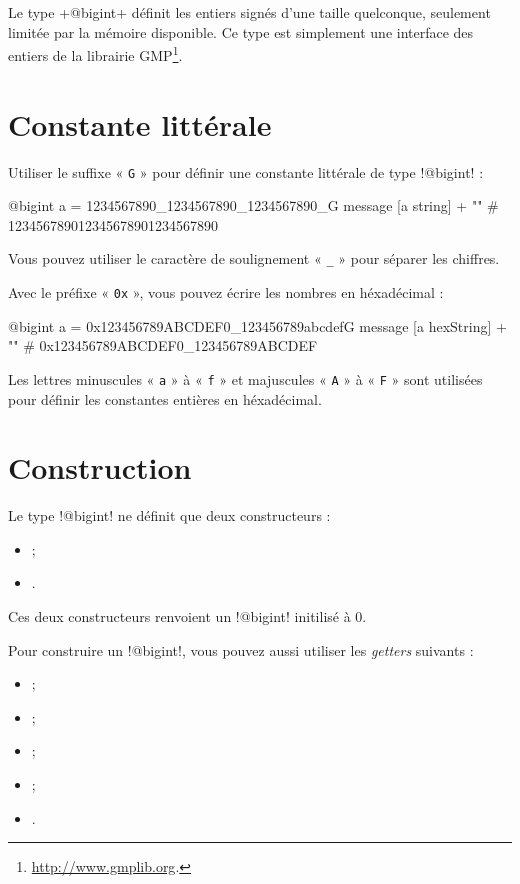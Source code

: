 



Le type \ggst+@bigint+ définit les entiers signés d'une taille quelconque, seulement limitée par la mémoire disponible. Ce type est simplement une interface des entiers de la librairie GMP\footnote{\url{http://www.gmplib.org}.}.

\section{Constante littérale}

Utiliser le suffixe « \texttt{G} » pour définir une constante littérale de type \ggst!@bigint! :
\begin{galgas3}
@bigint a = 1234567890_1234567890_1234567890_G
message [a string] + "\n" # 123456789012345678901234567890
\end{galgas3}

Vous pouvez utiliser le caractère de soulignement « \texttt{\_} » pour séparer les chiffres.

Avec le préfixe « \texttt{0x} », vous pouvez écrire les nombres en héxadécimal :
\begin{galgas3}
@bigint a = 0x123456789ABCDEF0_123456789abcdefG
message [a hexString] + "\n" # 0x123456789ABCDEF0_123456789ABCDEF
\end{galgas3}

Les lettres minuscules « \texttt{a} » à « \texttt{f} » et majuscules « \texttt{A} » à « \texttt{F} » sont utilisées pour définir les constantes entières en héxadécimal.

\section{Construction}

Le type \ggst!@bigint! ne définit que deux constructeurs :
\begin{itemize}
  \item {} ;
  \item {}.
\end{itemize}

Ces deux constructeurs renvoient un \ggst!@bigint! initilisé à $0$.

Pour construire un \ggst!@bigint!, vous pouvez aussi utiliser les \emph{getters} suivants :
\begin{itemize}
  \item {} ;
  \item {} ;
  \item {} ;
  \item {} ;
  \item {}.
\end{itemize}

